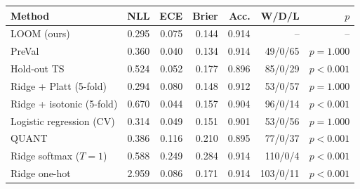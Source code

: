 \begin{tabular}{lrrrrrr}
\toprule
Method & NLL & ECE & Brier & Acc. & W/D/L & $p$ \\
\midrule
LOOM (ours) & 0.295 & 0.075 & 0.144 & 0.914 & -- & -- \\
PreVal & 0.360 & 0.040 & 0.134 & 0.914 & 49/0/65 & $p=1.000$ \\
Hold-out TS & 0.524 & 0.052 & 0.177 & 0.896 & 85/0/29 & $p<0.001$ \\
Ridge + Platt (5-fold) & 0.294 & 0.080 & 0.148 & 0.912 & 53/0/57 & $p=1.000$ \\
Ridge + isotonic (5-fold) & 0.670 & 0.044 & 0.157 & 0.904 & 96/0/14 & $p<0.001$ \\
Logistic regression (CV) & 0.314 & 0.049 & 0.151 & 0.901 & 53/0/56 & $p=1.000$ \\
QUANT & 0.386 & 0.116 & 0.210 & 0.895 & 77/0/37 & $p<0.001$ \\
Ridge softmax ($T=1$) & 0.588 & 0.249 & 0.284 & 0.914 & 110/0/4 & $p<0.001$ \\
Ridge one-hot & 2.959 & 0.086 & 0.171 & 0.914 & 103/0/11 & $p<0.001$ \\
\bottomrule
\end{tabular}
